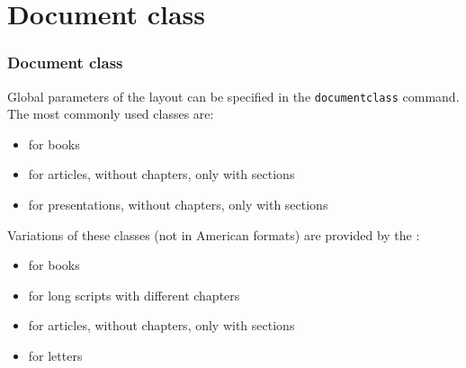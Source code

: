 \section{Document class}

\begin{frame}[fragile]
\frametitle{Document class}

Global parameters of the layout can be specified in the \lstinline|documentclass| command. The most commonly used classes are:
 
\begin{itemize}
	\item {} for books
	\item {} for articles, without chapters, only with sections
	\item {} for presentations, without chapters, only with sections
\end{itemize}

\pause 

Variations of these classes (not in American formats) are provided by the \textbf{}:

\begin{itemize}
	\item {} for books
	\item {} for long scripts with different chapters
	\item \alert{} for articles, without chapters, only with sections
	\item {} for letters
\end{itemize}


\end{frame}


